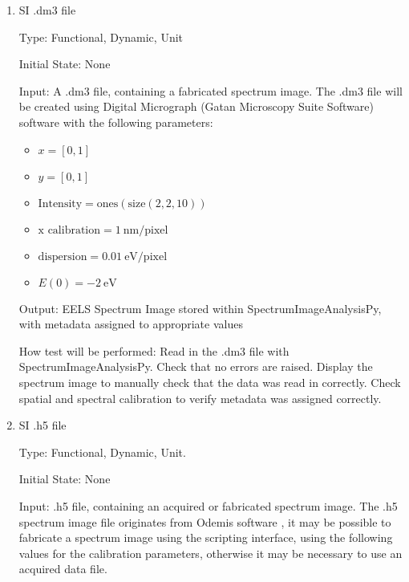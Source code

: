 \documentclass[12pt, titlepage]{article}
\newcommand{\progname}{SpectrumImageAnalysisPy}
\begin{document}
\begin{enumerate}
How test will be performed: Create a 3D data array and attempt to initialize a spectrum image in \progname{}. No errors should be raised. The spectrum image axes should be read in the correct order (x, y, E), and the calibrations should be applied to the correct axes.


\item{SI .dm3 file}

Type: Functional, Dynamic, Unit

Initial State: None

Input: A .dm3 file, containing a fabricated spectrum image. The .dm3 file will be created using Digital Micrograph (Gatan Microscopy Suite Software) software \cite{noauthor_gatan_nodate} with the following parameters:
\begin{itemize}
	\item $x = [0, 1]$
	\item $y = [0, 1]$
	\item $\text{Intensity} = \text{ones}(\text{size}(2,2,10))$
	\item $\text{x calibration} = 1\ \si{\nano\metre}/\text{pixel}$
	\item $\text{dispersion} = 0.01\ \si{\electronvolt}/\text{pixel}$
	\item $E(0) = -2\ \si{\electronvolt}$
\end{itemize}

Output: EELS Spectrum Image stored within \progname{}, with metadata assigned to appropriate values

How test will be performed: Read in the .dm3 file with \progname{}. Check that no errors are raised. Display the spectrum image to manually check that the data was read in correctly. Check spatial and spectral calibration to verify metadata was assigned correctly.


\item{SI .h5 file}

Type: Functional, Dynamic, Unit.

Initial State: None

Input: .h5 file, containing an acquired or fabricated spectrum image. The .h5 spectrum image file originates from Odemis software \cite{bv_odemis:_nodate}, it may be possible to fabricate a spectrum image using the scripting interface, using the following values for the calibration parameters, otherwise it may be necessary to use an acquired data file.


\end{enumerate}
\end{document}

